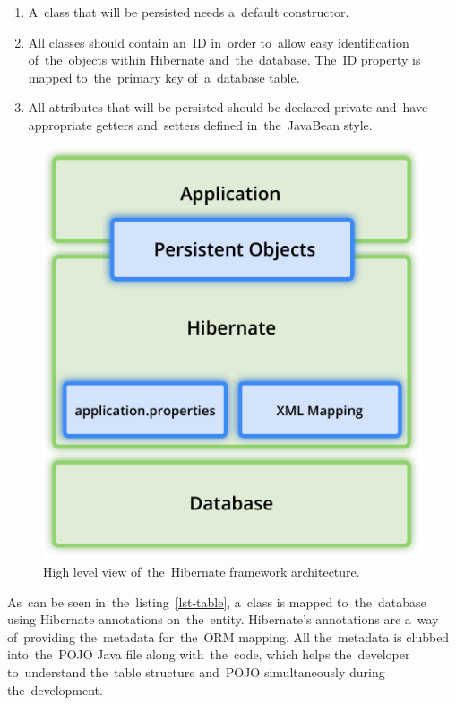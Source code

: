 \begin{enumerate}
  \item A~class that will be persisted needs a~default constructor.
  \item All classes should contain an~ID in~order to~allow easy identification
  of~the~objects within Hibernate and~the~database. The~ID property is mapped
  to~the~primary key of~a~database table.
  \item All attributes that will be persisted should be declared private
  and~have appropriate getters and~setters defined in~the~JavaBean style.
\end{enumerate}

\begin{figure}[!hbt]
	\centering
	\includegraphics[scale=0.8]{./figures/hibernate-architecture.pdf}
	\caption{High level view of~the~Hibernate framework architecture.}
\end{figure}

As~can be seen in~the~listing~\ref{lst-table}, a~class is mapped to~the~database
using Hibernate annotations on~the~entity. Hibernate's annotations are a~way
of~providing the~metadata for~the~ORM mapping. All the~metadata is clubbed
into~the~POJO Java file along with~the~code, which helps the~developer
to~understand the~table structure and~POJO simultaneously during
the~development.

